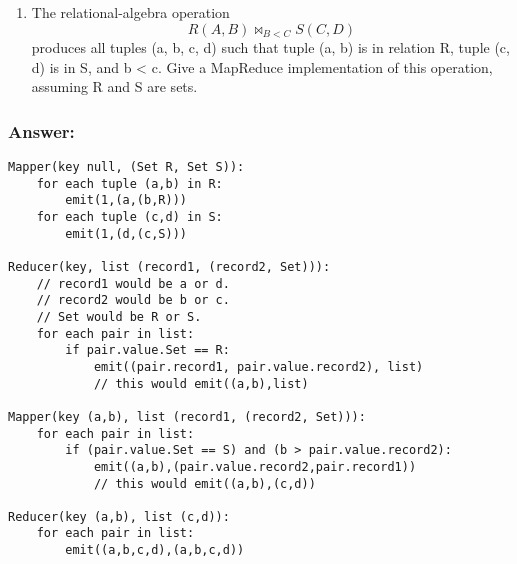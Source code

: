 \documentclass[11pt]{article}
\providecommand{\tightlist}{%
      \setlength{\itemsep}{0pt}\setlength{\parskip}{0pt}}
\begin{document}
    \begin{enumerate}
\def\labelenumi{\arabic{enumi}.}
\setcounter{enumi}{1}
\tightlist
\item
  The relational-algebra operation \[R(A, B) \bowtie_{B<C} S(C, D)\]
  produces all tuples (a, b, c, d) such that tuple (a, b) is in relation
  R, tuple (c, d) is in S, and b \textless{} c. Give a MapReduce
  implementation of this operation, assuming R and S are sets.
\end{enumerate}

    \hypertarget{answer}{%
\subsubsection{Answer:}\label{answer}}

    \begin{verbatim}
Mapper(key null, (Set R, Set S)):
    for each tuple (a,b) in R:
        emit(1,(a,(b,R)))
    for each tuple (c,d) in S:
        emit(1,(d,(c,S)))

Reducer(key, list (record1, (record2, Set))):
    // record1 would be a or d.
    // record2 would be b or c.
    // Set would be R or S.
    for each pair in list: 
        if pair.value.Set == R:
            emit((pair.record1, pair.value.record2), list)
            // this would emit((a,b),list)
            
Mapper(key (a,b), list (record1, (record2, Set))):
    for each pair in list:
        if (pair.value.Set == S) and (b > pair.value.record2):
            emit((a,b),(pair.value.record2,pair.record1))
            // this would emit((a,b),(c,d))
            
Reducer(key (a,b), list (c,d)):
    for each pair in list:
        emit((a,b,c,d),(a,b,c,d))
\end{verbatim}


    
    
    
\end{document}
